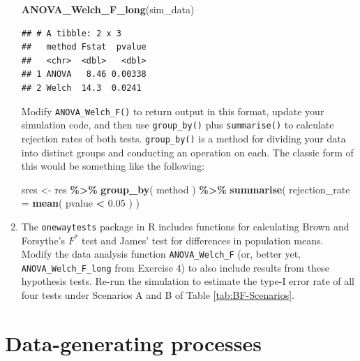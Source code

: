 \documentclass[
]{book}
\newenvironment{Shaded}{\begin{snugshade}}{\end{snugshade}}
\newcommand{\AttributeTok}[1]{\textcolor[rgb]{0.13,0.29,0.53}{#1}}
\newcommand{\FloatTok}[1]{\textcolor[rgb]{0.00,0.00,0.81}{#1}}
\newcommand{\FunctionTok}[1]{\textcolor[rgb]{0.13,0.29,0.53}{\textbf{#1}}}
\newcommand{\NormalTok}[1]{#1}
\newcommand{\OtherTok}[1]{\textcolor[rgb]{0.56,0.35,0.01}{#1}}
\newcommand{\SpecialCharTok}[1]{\textcolor[rgb]{0.81,0.36,0.00}{\textbf{#1}}}
\begin{document}
\begin{enumerate}
\begin{Shaded}
\begin{Highlighting}[]
\FunctionTok{ANOVA\_Welch\_F\_long}\NormalTok{(sim\_data)}
\end{Highlighting}
\end{Shaded}

\begin{verbatim}
## # A tibble: 2 x 3
##   method Fstat  pvalue
##   <chr>  <dbl>   <dbl>
## 1 ANOVA   8.46 0.00338
## 2 Welch  14.3  0.0241
\end{verbatim}

  Modify \texttt{ANOVA\_Welch\_F()} to return output in this format, update your simulation code, and then use \texttt{group\_by()} plus \texttt{summarise()} to calculate rejection rates of both tests.
  \texttt{group\_by()} is a method for dividing your data into distinct groups and conducting an operation on each.
  The classic form of this would be something like the following:

\begin{Shaded}
\begin{Highlighting}[]
\NormalTok{sres }\OtherTok{\textless{}{-}} 
\NormalTok{  res }\SpecialCharTok{\%\textgreater{}\%} 
  \FunctionTok{group\_by}\NormalTok{( method ) }\SpecialCharTok{\%\textgreater{}\%}
  \FunctionTok{summarise}\NormalTok{( }\AttributeTok{rejection\_rate =} \FunctionTok{mean}\NormalTok{( pvalue }\SpecialCharTok{\textless{}} \FloatTok{0.05}\NormalTok{ ) )}
\end{Highlighting}
\end{Shaded}
\item
  The \texttt{onewaytests} package in R includes functions for calculating Brown and Forsythe's \(F^*\) test and James' test for differences in population means. Modify the data analysis function \texttt{ANOVA\_Welch\_F} (or, better yet, \texttt{ANOVA\_Welch\_F\_long} from Exercise 4) to also include results from these hypothesis tests. Re-run the simulation to estimate the type-I error rate of all four tests under Scenarios A and B of Table \ref{tab:BF-Scenarios}.
\end{enumerate}

\chapter{Data-generating processes}\label{data-generating-processes}
\end{document}

